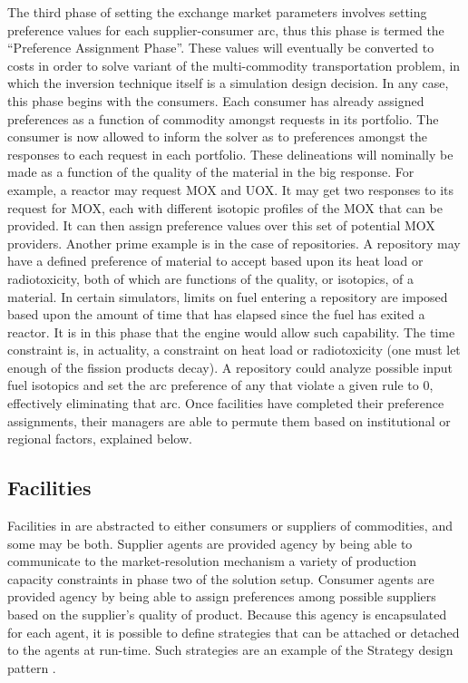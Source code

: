 The third phase of setting the exchange market parameters involves setting
preference values for each supplier-consumer arc, thus this phase is termed the
``Preference Assignment Phase''. These values will eventually be converted to
costs in order to solve variant of the multi-commodity transportation problem,
in which the inversion technique itself is a simulation design decision. In any
case, this phase begins with the consumers. Each consumer has already assigned
preferences as a function of commodity amongst requests in its portfolio. The
consumer is now allowed to inform the solver as to preferences amongst the
responses to each request in each portfolio. These delineations will nominally
be made as a function of the quality of the material in the big response. For
example, a reactor may request MOX and UOX. It may get two responses to its
request for MOX, each with different isotopic profiles of the MOX that can be
provided. It can then assign preference values over this set of potential MOX
providers. Another prime example is in the case of repositories. A repository
may have a defined preference of material to accept based upon its heat load or
radiotoxicity, both of which are functions of the quality, or isotopics, of a
material. In certain simulators, limits on fuel entering a repository are
imposed based upon the amount of time that has elapsed since the fuel has exited
a reactor. It is in this phase that the \Cyclus engine would allow such
capability. The time constraint is, in actuality, a constraint on heat load or
radiotoxicity (one must let enough of the fission products decay). A repository
could analyze possible input fuel isotopics and set the arc preference of any
that violate a given rule to 0, effectively eliminating that arc. Once
facilities have completed their preference assignments, their managers are able
to permute them based on institutional or regional factors, explained below.

\subsection{Facilities}

Facilities in \Cyclus are abstracted to either consumers or suppliers of
commodities, and some may be both. Supplier agents are provided agency by being
able to communicate to the market-resolution mechanism a variety of production
capacity constraints in phase two of the solution setup. Consumer agents are
provided agency by being able to assign preferences among possible suppliers
based on the supplier's quality of product. Because this agency is encapsulated
for each agent, it is possible to define strategies that can be attached or
detached to the agents at run-time. Such strategies are an example of the
Strategy design pattern \cite{vlissides_design_1995}.

